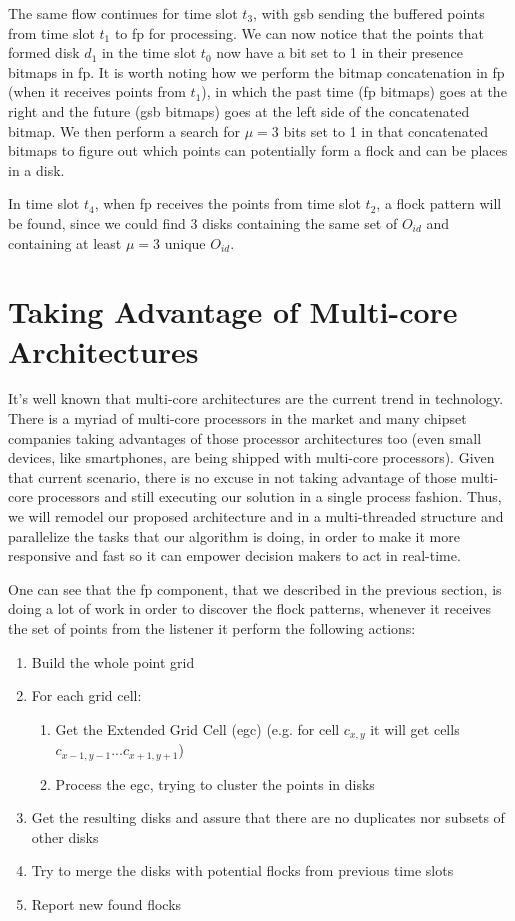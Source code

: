The same flow continues for time slot $t_3$, with \ac{gsb} sending the buffered points from time slot $t_1$ to \ac{fp}
for processing. We can now notice that the points that formed disk $d_1$ in the time slot $t_0$ now have a bit set to 1
in their presence bitmaps in \ac{fp}. It is worth noting how we perform the bitmap concatenation in \ac{fp} (when it
receives points from $t_1$), in which the past time (\ac{fp} bitmaps) goes at the right and the future (\ac{gsb}
bitmaps) goes at the left side of the concatenated bitmap. We then perform a search for $\mu = 3$ bits set to 1 in that
concatenated bitmaps to figure out which points can potentially form a flock and can be places in a disk.

In time slot $t_4$, when \ac{fp} receives the points from time slot $t_2$, a flock pattern will be found, since we could find
3 disks containing the same set of $O_{id}$ and containing at least $\mu = 3$ unique $O_{id}$.

\section{Taking Advantage of Multi-core Architectures}
\label{sec:multithread}
It's well known that multi-core architectures are the current trend in technology. There is a myriad of multi-core
processors in the market and many chipset companies taking advantages of those processor architectures too (even small
devices, like smartphones, are being shipped with multi-core processors). Given that current scenario, there is no
excuse in not taking advantage of those multi-core processors and still executing our solution in a single process
fashion. Thus, we will remodel our proposed architecture and in a multi-threaded structure and parallelize the tasks
that our algorithm is doing, in order to make it more responsive and fast so it can empower decision makers to act in
real-time.

One can see that the \ac{fp} component, that we described in the previous section, is doing a lot of work in order to
discover the flock patterns, whenever it receives the set of points from the listener it perform the following actions:

\begin{enumerate}
    \item Build the whole point grid
    \item For each grid cell:
    \begin{enumerate}
        \item Get the Extended Grid Cell (\ac{egc}) (e.g. for cell $c_{x,y}$ it will get cells
            $c_{x - 1, y - 1}...c_{x + 1, y+ 1}$)
        \item Process the \ac{egc}, trying to cluster the points in disks
    \end{enumerate}
    \item Get the resulting disks and assure that there are no duplicates nor subsets of other disks
    \item Try to merge the disks with potential flocks from previous time slots
    \item Report new found flocks
\end{enumerate}

